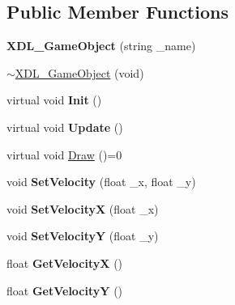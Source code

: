\subsection*{Public Member Functions}
\begin{DoxyCompactItemize}
\item 
\hypertarget{class_x_d_l___game_object_ac2bf327721f071e6192c5e4691609a98}{{\bfseries X\-D\-L\-\_\-\-Game\-Object} (string \-\_\-name)}\label{class_x_d_l___game_object_ac2bf327721f071e6192c5e4691609a98}

\item 
\hyperlink{class_x_d_l___game_object_a27fd4e872e6e1bb063f5d1c8acf3119c}{$\sim$\-X\-D\-L\-\_\-\-Game\-Object} (void)
\item 
\hypertarget{class_x_d_l___game_object_a65f42bdf8f833262da1b689f9454afd7}{virtual void {\bfseries Init} ()}\label{class_x_d_l___game_object_a65f42bdf8f833262da1b689f9454afd7}

\item 
\hypertarget{class_x_d_l___game_object_a28b5db1a0e150b66e33605d95e6705d5}{virtual void {\bfseries Update} ()}\label{class_x_d_l___game_object_a28b5db1a0e150b66e33605d95e6705d5}

\item 
virtual void \hyperlink{class_x_d_l___game_object_a46ab89c9622631cf13114a493b1b0a2d}{Draw} ()=0
\item 
\hypertarget{class_x_d_l___game_object_ab330c902ae14f980441c95821a4d2652}{void {\bfseries Set\-Velocity} (float \-\_\-x, float \-\_\-y)}\label{class_x_d_l___game_object_ab330c902ae14f980441c95821a4d2652}

\item 
\hypertarget{class_x_d_l___game_object_a0e666a4d38bbe23b32b12f79ea583455}{void {\bfseries Set\-Velocity\-X} (float \-\_\-x)}\label{class_x_d_l___game_object_a0e666a4d38bbe23b32b12f79ea583455}

\item 
\hypertarget{class_x_d_l___game_object_a21374b9d1abd01efdd81dd3fc9b337ee}{void {\bfseries Set\-Velocity\-Y} (float \-\_\-y)}\label{class_x_d_l___game_object_a21374b9d1abd01efdd81dd3fc9b337ee}

\item 
\hypertarget{class_x_d_l___game_object_add121ab40a76ee2189bc4546f4837262}{float {\bfseries Get\-Velocity\-X} ()}\label{class_x_d_l___game_object_add121ab40a76ee2189bc4546f4837262}

\item 
\hypertarget{class_x_d_l___game_object_afb2098323b599609cf87a8e6fe01d10d}{float {\bfseries Get\-Velocity\-Y} ()}\label{class_x_d_l___game_object_afb2098323b599609cf87a8e6fe01d10d}


\end{DoxyCompactItemize}
